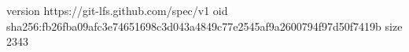 version https://git-lfs.github.com/spec/v1
oid sha256:fb26fba09afc3e74651698c3d043a4849c77e2545af9a2600794f97d50f7419b
size 2343
